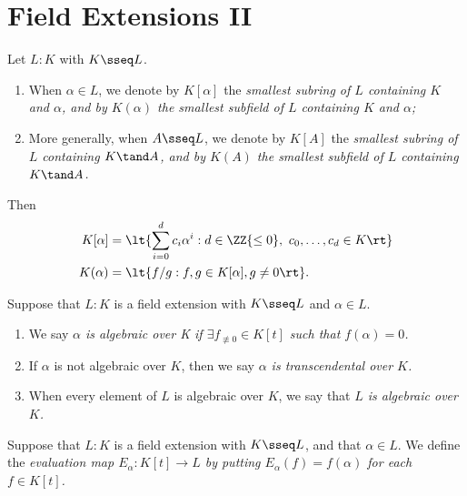 \documentclass[a4paper]{article}
\begin{document}
\section{Field Extensions II}
\begin{tdefinition}
  Let \( L:K \) with \( K\sseq L \).
  \begin{enumerate}[label=(\roman*)]
    \item When \( \alpha\in L \), we denote by \( K[\alpha] \) the \it{smallest subring of \( L \) containing \( K \) and \( \alpha \)}, and by \( K(\alpha) \) the \it{smallest subfield of \( L \) containing \( K \) and \( \alpha \)};
    \item More generally, when \( A\sseq L \), we denote by \( K[A] \) the \it{smallest subring of \( L \) containing \( K \tand A \)}, and by \( K(A) \) the \it{smallest subfield of \( L \) containing \( K \tand A \)}.
  \end{enumerate}
  Then \begin{align*}
    K[\alpha] &= \lt\{ \sum_{i=0}^{d}c_i\alpha^i : d\in \ZZ{\leq 0},\ c_0,\ldots,c_d\in K \rt\} \\
    K(\alpha) &= \lt\{ f/g : f,g\in K[\alpha], g\neq 0 \rt\}.
  \end{align*}
\end{tdefinition}

\begin{tdefinition}
  Suppose that \( L: K \) is a field extension with \( K\sseq L \) and \( \alpha\in L \).
  \begin{enumerate}[label=(\roman*)]
    \item We say \it{\( \alpha \) is algebraic over K} if \( \exists f_{\not\equiv 0} \in K[t] \) such that \( f(\alpha)=0 \).
    \item If \( \alpha \) is not algebraic over \( K \), then we say \it{\( \alpha \) is transcendental over \( K \)}.
    \item When every element of \( L \) is algebraic over \( K \), we say that \it{\( L \) is algebraic over \( K \)}.
  \end{enumerate}
\end{tdefinition}

\begin{tdefinition}
  Suppose that \( L: K \) is a field extension with \( K \sseq L \), and that \( \alpha\in L \).
  We define the \it{evaluation map} \( E_\alpha : K[t] \to L \) by putting \( E_\alpha(f) = f(\alpha) \) for each \( f \in K[t] \).
\end{tdefinition}
\end{document}
